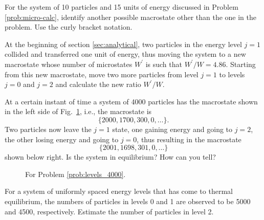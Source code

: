 \begin{problem}
  For the system of 10 particles and 15 units of energy discussed in
  Problem \ref{prob:micro-calc}, identify another possible macrostate
  other than the one in the problem.  Use the curly bracket notation.
\end{problem}

\begin{problem}
  At the beginning of section \ref{sec:analytical}, two particles in
  the energy level $j = 1$ collided and transferred one unit of
  energy, thus moving the system to a new macrostate whose number of
  microstates $W^\prime$ is such that $W^\prime/W = 4.86$.  Starting
  from this new macrostate, move two more particles from level $j =1$
  to levels $j = 0$ and $j = 2$ and calculate the new ratio
  $W^\prime/W$.
  \label{prob:w_ratio}
\end{problem}
	
\begin{problem}
  At a certain instant of time a system of 4000 particles has the
  macrostate shown in the left side of Fig.~\ref{fig:levels_4000},
  i.e., the macrostate is 
  \[\{2000, 1700, 300, 0,\dots\}.\]  
  Two
  particles now leave the $j = 1$ state, one gaining energy and going
  to $j = 2$, the other losing energy and going to $j = 0$, thus
  resulting in the macrostate 
  \[\{2001, 1698, 301, 0,\dots\}\] 
  shown
  below right.  Is the system in equilibrium?  How can you tell?
  \label{prob:levels_4000}
  \begin{figure}[h]
\begin{center}
\end{center}
\caption{For Problem \ref{prob:levels_4000}.}
\label{fig:levels_4000}
\end{figure}
\end{problem}


\begin{problem}
  For a system of uniformly spaced energy levels that has come to
  thermal equilibrium, the numbers of particles in levels 0 and 1 are
  observed to be 5000 and 4500, respectively.  Estimate the number of
  particles in level 2.
  \label{prob:equilibrium}
\end{problem}


